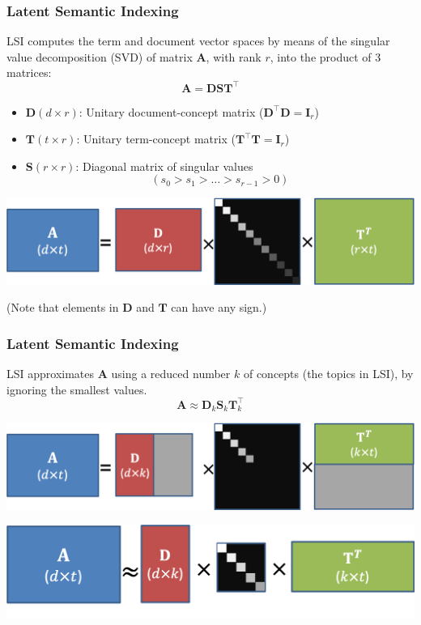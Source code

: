 \documentclass{beamer}
\begin{document}
\begin{frame}
\frametitle{Latent Semantic Indexing}
\footnotesize
LSI computes the term and document vector spaces by means of the singular value decomposition (SVD) of matrix $\mathbf A$, with rank $r$, into the product of 3 matrices:
$${\mathbf A} = {\mathbf D} {\mathbf S} {\mathbf T}^\top$$

\begin{itemize}
    \item ${\mathbf D} (d\times r)$: Unitary document-concept matrix (${\mathbf D}^\top {\mathbf D} = {\mathbf I}_r$) 
    \item ${\mathbf T} (t\times r)$: Unitary term-concept matrix (${\mathbf T}^\top {\mathbf T} = {\mathbf I}_r$) 
    \item ${\mathbf S} (r\times r)$: Diagonal matrix of singular values
    $$(s_0>s_1>\dots>s_{r-1}>0)$$
\end{itemize}
\centerline{\includegraphics[width=\textwidth]{./figs/SVD.png}}

(Note that elements in ${\mathbf D}$ and ${\mathbf T}$ can have any sign.)
    
\end{frame}



\begin{frame}
\frametitle{Latent Semantic Indexing}
LSI approximates $\mathbf A$ using a reduced number $k$ of concepts (the topics in LSI), by ignoring the smallest values.
$${\mathbf A} \approx {\mathbf D}_k {\mathbf S}_k {\mathbf T}_k^\top$$

\centerline{\includegraphics[width=.8\textwidth]{./figs/SVD_k.png}}

\vspace{.5cm}

\centerline{\includegraphics[width=.6\textwidth]{./figs/SVD_k2.png}}

\end{frame}
\end{document}
